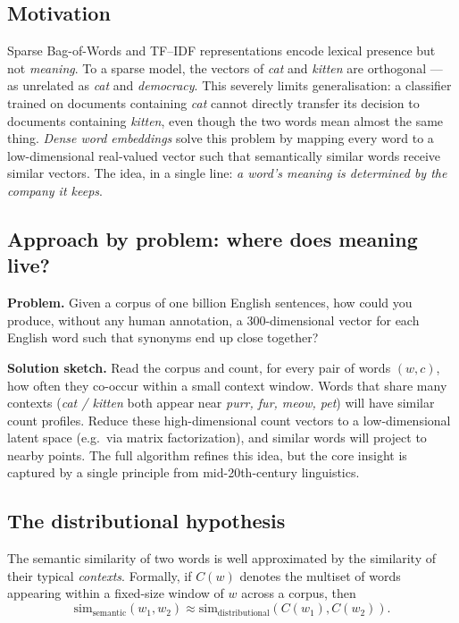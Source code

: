 \subsection{Motivation}
Sparse Bag-of-Words and TF--IDF representations encode lexical presence but not \emph{meaning}. To a sparse model, the vectors of \emph{cat} and \emph{kitten} are orthogonal --- as unrelated as \emph{cat} and \emph{democracy}. This severely limits generalisation: a classifier trained on documents containing \emph{cat} cannot directly transfer its decision to documents containing \emph{kitten}, even though the two words mean almost the same thing. \emph{Dense word embeddings} solve this problem by mapping every word to a low-dimensional real-valued vector such that semantically similar words receive similar vectors. The idea, in a single line: \emph{a word's meaning is determined by the company it keeps}.

\subsection{Approach by problem: where does meaning live?}
\textbf{Problem.} Given a corpus of one billion English sentences, how could you produce, without any human annotation, a 300-dimensional vector for each English word such that synonyms end up close together?

\textbf{Solution sketch.} Read the corpus and count, for every pair of words $(w, c)$, how often they co-occur within a small context window. Words that share many contexts (\emph{cat / kitten} both appear near \emph{purr, fur, meow, pet}) will have similar count profiles. Reduce these high-dimensional count vectors to a low-dimensional latent space (e.g.\ via matrix factorization), and similar words will project to nearby points. The full algorithm refines this idea, but the core insight is captured by a single principle from mid-20th-century linguistics.

\subsection{The distributional hypothesis}

\begin{definition}
The semantic similarity of two words is well approximated by the similarity of their typical \emph{contexts}. Formally, if $C(w)$ denotes the multiset of words appearing within a fixed-size window of $w$ across a corpus, then
\[ \mathrm{sim}_{\text{semantic}}(w_1, w_2) \approx \mathrm{sim}_{\text{distributional}}(C(w_1), C(w_2)). \]
\end{definition}

